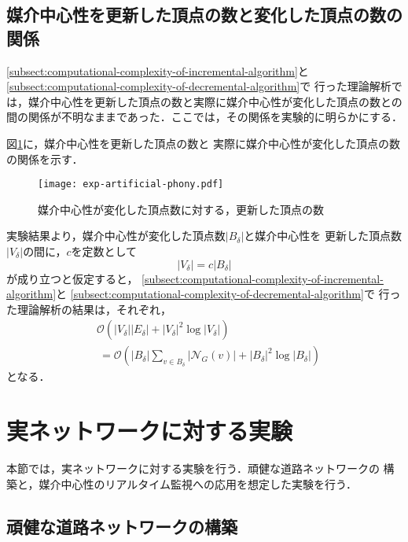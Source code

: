 \subsection{媒介中心性を更新した頂点の数と変化した頂点の数の関係}

\ref{subsect:computational-complexity-of-incremental-algorithm}と
\ref{subsect:computational-complexity-of-decremental-algorithm}で
行った理論解析では，媒介中心性を更新した頂点の数と実際に媒介中心性が変化した頂点の数との
間の関係が不明なままであった．ここでは，その関係を実験的に明らかにする．

図\ref{fig:exp-artificial-phony}に，媒介中心性を更新した頂点の数と
実際に媒介中心性が変化した頂点の数の関係を示す．

\begin{figure}[tb]
  \centering
  \texttt{[image: exp-artificial-phony.pdf]}
  \caption{媒介中心性が変化した頂点数に対する，更新した頂点の数}
  \label{fig:exp-artificial-phony}
\end{figure}

実験結果より，媒介中心性が変化した頂点数$\lvert B_\delta\rvert$と媒介中心性を
更新した頂点数$\lvert V_\delta\rvert$の間に，$c$を定数として
\[ \lvert V_\delta\rvert=c\lvert B_\delta\rvert \]
が成り立つと仮定すると，
\ref{subsect:computational-complexity-of-incremental-algorithm}と
\ref{subsect:computational-complexity-of-decremental-algorithm}で
行った理論解析の結果は，それぞれ，
\begin{equation*}
  \begin{aligned}
    &\mathcal{O}(\lvert V_\delta\rvert\lvert E_\delta\rvert+\lvert V_\delta\rvert^2\log\lvert V_\delta\rvert) \\
    &\:=\mathcal{O}(\lvert B_\delta\rvert\sum_{v\in B_\delta}\lvert\mathcal{N}_G(v)\rvert+\lvert B_\delta\rvert^2\log\lvert B_\delta\rvert)
  \end{aligned}
\end{equation*}
となる．

\section{実ネットワークに対する実験}
\label{sect:exp-realnet}

本節では，実ネットワークに対する実験を行う．頑健な道路ネットワークの
構築と，媒介中心性のリアルタイム監視への応用を想定した実験を行う．

\subsection{頑健な道路ネットワークの構築}
\label{subsect:exp-road}

